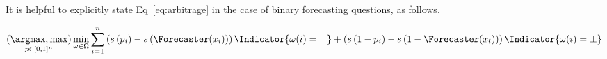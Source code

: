 It is helpful to explicitly state Eq~\ref{eq:arbitrage} in the case of binary forecasting questions, as follows.

\begin{equation}
    \argmaxmax_{\consp\in[0,1]^n} \min_{\omega\in\Omega} \sum_{i=1}^n \left(\score{\consp_i}-\score{\Forecaster(x_i)}\right)\Indicator{\omega(i)=\top} + \left(\score{1-\consp_i}-\score{1-\Forecaster(x_i)}\right)\Indicator{\omega(i)=\bot}
    \label{eq:arbitrage_}
\end{equation}










